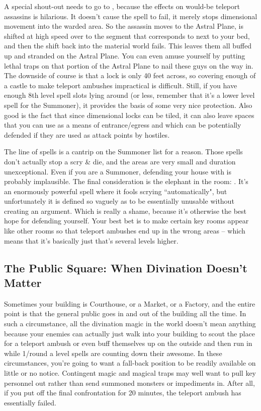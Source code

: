 A special shout-out needs to go to , because the effects on would-be teleport assassins is hilarious. It doesn't cause the spell to fail, it merely stops dimensional movement into the warded area. So the assassin moves to the Astral Plane, is shifted at high speed over to the segment that corresponds to next to your bed, and then the shift back into the material world fails. This leaves them all buffed up and stranded on the Astral Plane. You can even amuse yourself by putting lethal traps on that portion of the Astral Plane to nail these guys on the way in. The downside of course is that a lock is only 40 feet across, so covering enough of a castle to make teleport ambushes impractical is difficult. Still, if you have enough 8th level spell slots lying around (or less, remember that it's a lower level spell for the Summoner), it provides the basis of some very nice protection. Also good is the fact that since dimensional locks can be tiled, it can also leave spaces that you can use as a means of entrance/egress and which can be potentially defended if they are used as attack points by hostiles.

The  line of spells is a cantrip on the Summoner list for a reason. Those spells don't actually stop a scry \& die, and the areas are very small and duration unexceptional. Even if you are a Summoner, defending your house with  is probably implausible. The final consideration is the elephant in the room: . It's an enormously powerful spell where it fools scrying ``automatically", but unfortunately it is defined so vaguely as to be essentially unusable without creating an argument. Which is really a shame, because it's otherwise the best hope for defending yourself. Your best bet is to make certain key rooms appear like other rooms so that teleport ambushes end up in the wrong areas -- which means that it's basically just  that's several levels higher.

\subsection{The Public Square: When Divination Doesn't Matter}

Sometimes your building is Courthouse, or a Market, or a Factory, and the entire point is that the general public goes in and out of the building all the time. In such a circumstance, all the divination magic in the world doesn't mean anything because your enemies can actually just walk into your building to scout the place for a teleport ambush or even buff themselves up on the outside and then run in while 1/round a level spells are counting down their awesome. In these circumstances, you're going to want a fall-back position to be readily available on little or no notice. Contingent magic and magical traps may well want to pull key personnel out rather than send summoned monsters or impediments in. After all, if you put off the final confrontation for 20 minutes, the teleport ambush has essentially failed.

